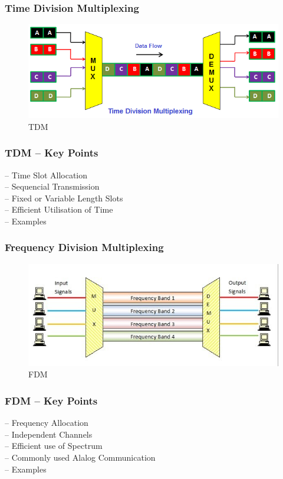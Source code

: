 \documentclass{beamer}
\begin{document}
\begin{frame}
\frametitle{Time Division Multiplexing}
	\begin{figure}
		\includegraphics[scale = 0.5]{figs/tdm.png}
		\caption{TDM}
	\end{figure}
\end{frame}
\begin{frame}
\frametitle{TDM -- Key Points}
-- Time Slot Allocation \\
-- Sequencial Transmission  \\
-- Fixed or Variable Length Slots \\
-- Efficient Utilisation of Time \\
-- Examples \\
\end{frame}
\begin{frame}
\frametitle{Frequency Division Multiplexing}
	\begin{figure}
		\includegraphics[scale = 0.5]{figs/fdm.jpg}
		\caption{FDM}
	\end{figure}
\end{frame}
\begin{frame}
\frametitle{FDM -- Key Points}
-- Frequency Allocation \\
-- Independent Channels \\
-- Efficient use of Spectrum \\
-- Commonly used Alalog Communication \\
-- Examples \\
\end{frame}
\end{document}
